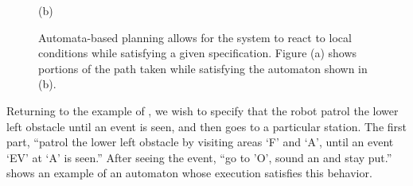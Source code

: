 \begin{figure}[bt]
\begin{minipage}{0.85\linewidth}
{\footnotesize (b)}
\end{minipage}

\caption[Automata-based planning]{ Automata-based planning allows for
  the system to react to local conditions while satisfying a given
  specification.   Figure (a) shows portions of the path taken while satisfying
  the automaton shown in (b).  }

  \label{fig:approach_automaton} 

\end{figure}


Returning to the example of , we wish to specify that the
robot patrol the lower left obstacle until an event is seen, and then goes to a
particular station.  The first part, ``patrol
the lower left obstacle by visiting areas `F' and `A', until an event `EV' at `A' is
seen.''  
After seeing the event, ``go to 'O', sound an  and stay put.''
 shows an example of an automaton whose execution satisfies
this behavior.  %
 
